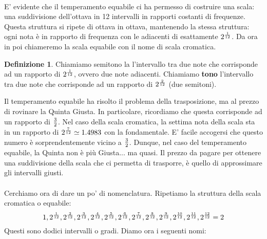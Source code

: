 \documentclass[12pt,a4paper]{report}
\theoremstyle{definition}
\newtheorem{Def}{Definizione}[chapter]
\theoremstyle{Theorem}
\theoremstyle{definition}
\theoremstyle{definition}
\theoremstyle{definition}
\begin{document}
	 \\
	 E' evidente che il temperamento equabile ci ha permesso di costruire una scala: una suddivisione dell'ottava in 12 intervalli in rapporti costanti di frequenze. Questa struttura si ripete di ottava in ottava, mantenendo la stessa struttura: ogni nota è in rapporto di frequenza con le adiacenti di esattamente $2^{1\over 12}$.
	 Da ora in poi chiameremo la scala equabile con il nome di scala cromatica. 
	 \begin{Def}
	 	Chiamiamo semitono la l'intervallo tra due note che corrisponde ad un rapporto di $2^{1\over12}$, ovvero due note adiacenti. Chiamiamo \textbf{tono} l'intervallo tra due note che corrisponde ad un rapporto di $2^{2\over 12}$ (due semitoni).
	 \end{Def} 
	 Il temperamento equabile ha risolto il problema della trasposizione, ma al prezzo di rovinare la Quinta Giusta. In particolare, ricordiamo che questa corrisponde ad un rapporto di $3\over 2$. Nel caso della scala cromatica, la settima nota della scala sta in un rapporto di $2^{7\over 12}\simeq 1.4983$ con la fondamentale. E' facile accogersi che questo numero è sorprendentemente vicino a $3\over 2$. Dunque, nel caso del temperamento equabile, la Quinta non è più Giusta... ma quasi. Il prezzo da pagare per ottenere una suddivisione della scala che ci permetta di trasporre, è quello di approssimare gli intervalli giusti.\\
	 \\
	 Cerchiamo ora di dare un po' di nomenclatura. Ripetiamo la struttura della scala cromatica o equabile:
	 $$1,2^{1\over12},2^{2\over12},2^{3\over12},2^{4\over12},2^{5\over12},2^{6\over12},2^{7\over12},2^{8\over12},2^{9\over12},2^{10\over12},2^{11\over12},2^{12\over12}=2$$
	 Questi sono dodici intervalli o gradi. Diamo ora i seguenti nomi:
\end{document}
